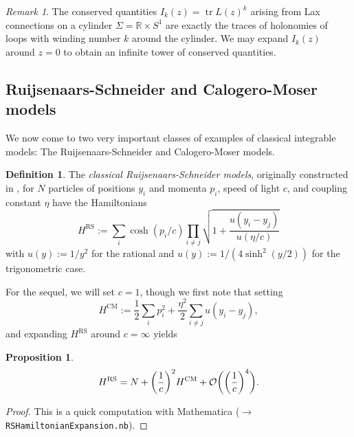 \documentclass[11pt]{report}
\newtheorem{prop}[theorem]{Proposition}
\theoremstyle{definition}
\newtheorem{definition}[theorem]{Definition}
\theoremstyle{remark}
\newtheorem*{remark}{Remark}
\theoremstyle{remark}
\newcommand{\R}{\mathbb{R}}
\begin{document}
\begin{remark}
The conserved quantities $I_k(z) = \operatorname{tr} L(z)^k$ arising from Lax connections on a cylinder $\Sigma = \R \times S^1$ are exactly the traces of holonomies of loops with winding number $k$ around the cylinder. We may expand $I_k(z)$ around $z=0$ to obtain an infinite tower of conserved quantities.
\end{remark}

\subsection{Ruijsenaars-Schneider and Calogero-Moser models}

We now come to two very important classes of examples of classical integrable models: The Ruijsenaars-Schneider and Calogero-Moser models.

\begin{definition}
The \emph{classical Ruijsenaars-Schneider models}, originally constructed in \cite{article:ruijsenaars:1987}, for $N$ particles of positions $y_i$ and momenta $p_i$, speed of light $c$, and coupling constant $\eta$ have the Hamiltonians
\begin{equation}\label{equation:ratRSHamiltonian}
H^\text{RS} := \sum_i \cosh(p_i/c) \prod_{i \neq j} \sqrt{1 + \frac{u(y_i - y_j)}{u(\eta/c)}}
\end{equation}
with $u(y) := 1/y^2$ for the rational and $u(y) := 1/(4\sinh^2(y/2))$ for the trigonometric case.
\end{definition}

For the sequel, we will set $c=1$, though we first note that setting
\begin{equation}\label{equation:trigCMHamiltonian}
H^\text{CM} := \frac{1}{2} \sum_i p_i^2 + \frac{\eta^2}{2} \sum_{i \neq j} u(y_i-y_j),
\end{equation}
and expanding $H^\text{RS}$ around $c = \infty$ yields

\begin{prop}
\begin{equation*}
H^\textnormal{RS} = N + \bigg( \frac{1}{c} \bigg)^2 H^\textnormal{CM} + \mathcal{O}\bigg( \bigg( \frac{1}{c} \bigg)^4 \bigg).
\end{equation*}
\end{prop}

\begin{proof}
This is a quick computation with Mathematica ($\to$ \texttt{RSHamiltonianExpansion.nb}).
\end{proof}
\end{document}
